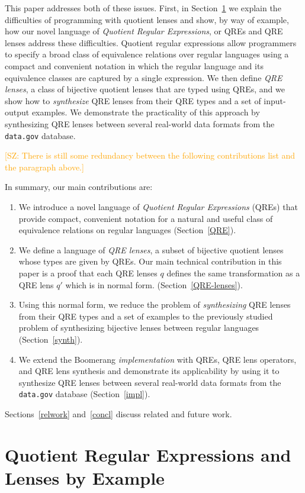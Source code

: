 \documentclass{svproc}
\newcommand{\FINISH}[3]{\ifdraft\textcolor{#1}{[#2: #3]}\fi}
\newcommand{\saz}[1]{\FINISH{orange}{SZ}{#1}}
\begin{document}
This paper addresses both of these issues.  First, in Section~\ref{sec:example} we
explain the difficulties of programming with quotient lenses and show, by way of
example, how our novel language of {\em Quotient Regular Expressions}, or QREs
and QRE lenses address these difficulties.  Quotient regular expressions allow
programmers to specify a broad class of equivalence relations over regular
languages using a compact and convenient notation in which the regular language
and its equivalence classes are captured by a single expression.  We then
define {\em QRE lenses}, a class of bijective quotient lenses that are typed
using QREs, and we show how to {\em synthesize} QRE lenses from their QRE types
and a set of input-output examples.  We demonstrate the practicality of this
approach by synthesizing QRE lenses between several real-world data formats
from the {\tt data.gov} database.

\saz{There is still some redundancy between the following contributions list and
  the paragraph above.}

In summary, our main contributions are:
\begin{enumerate}
\item We introduce a novel language of {\em Quotient Regular Expressions}
(QREs) that provide compact, convenient notation for a natural and useful
class of equivalence relations on regular languages (Section~\ref{QRE}).
\item We define a language of {\em QRE lenses}, a subset of bijective quotient
lenses whose types are given by QREs. Our main technical contribution in this
paper is a proof that each QRE lenses $q$ defines the same transformation as a
QRE lens $q'$ which is in normal form. (Section~\ref{QRE-lenses}).
\item Using this normal form, we reduce the problem of {\em synthesizing}
QRE lenses from their QRE types and a set of examples to the previously studied
problem of synthesizing bijective lenses between regular languages 
(Section~\ref{synth}).
\item We extend the Boomerang {\em implementation} with QREs, QRE lens operators,
and QRE lens synthesis and demonstrate its applicability by using it to
synthesize QRE lenses between several real-world data formats from the
{\tt data.gov} database (Section~\ref{impl}).
\end{enumerate}
Sections~\ref{relwork} and~\ref{concl} discuss related and future work.

\section{Quotient Regular Expressions and Lenses by Example}
\label{sec:example}
\end{document}
